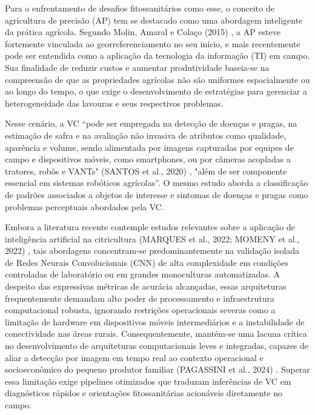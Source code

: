 \documentclass[11pt,a4paper]{article}
\begin{document}
Para o enfrentamento de desafios fitossanitários como esse, o conceito de agricultura de precisão (AP) tem se destacado como uma abordagem inteligente da prática agrícola. Segundo Molin, Amaral e Colaço (2015) \cite{Molin2015}, a AP esteve fortemente vinculada ao georreferenciamento no seu início, e mais recentemente pode ser entendida como a aplicação da tecnologia da informação (TI) em campo. Sua finalidade de reduzir custos e aumentar produtividade baseia-se na compreensão de que as propriedades agrícolas não são uniformes espacialmente ou ao longo do tempo, o que exige o desenvolvimento de estratégias para gerenciar a heterogeneidade das lavouras e seus respectivos problemas.

Nesse cenário, a VC “pode ser empregada na detecção de doenças e pragas, na estimação de safra e na avaliação não invasiva de atributos como qualidade, aparência e volume, sendo alimentada por imagens capturadas por equipes de campo e dispositivos móveis, como smartphones, ou por câmeras acopladas a tratores, robôs e VANTs" (SANTOS et al., 2020) \cite{santos2020visao}, "além de ser componente essencial em sistemas robóticos agrícolas”. O mesmo estudo aborda a classificação de padrões associados a objetos de interesse e sintomas de doenças e pragas como problemas perceptuais  abordados pela VC.

Embora a literatura recente contemple estudos relevantes sobre a aplicação de inteligência artificial na citricultura (MARQUES et al., 2022; MOMENY et al., 2022) \cite{Marques2022} \cite{Momeny2022}, tais abordagens concentram-se predominantemente na validação isolada de Redes Neurais Convolucionais (CNN) de alta complexidade em condições controladas de laboratório ou em grandes monoculturas automatizadas. A despeito das expressivas métricas de acurácia alcançadas, essas arquiteturas frequentemente demandam alto poder de processamento e infraestrutura computacional robusta, ignorando restrições operacionais severas como a limitação de hardware em dispositivos móveis intermediários e a instabilidade de conectividade nas áreas rurais. Consequentemente, mantém-se uma lacuna crítica no desenvolvimento de arquiteturas computacionais leves e integradas, capazes de aliar a detecção por imagem em tempo real ao contexto operacional e socioeconômico do pequeno produtor familiar (PAGASSINI et al., 2024) \cite{Pagassini2024}. Superar essa limitação exige pipelines otimizados que traduzam inferências de VC em diagnósticos rápidos e orientações fitossanitárias acionáveis diretamente no campo.
\end{document}
